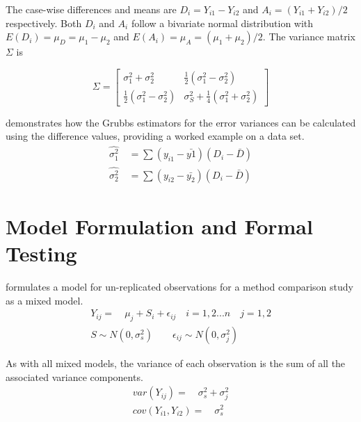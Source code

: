 \documentclass[12pt, a4paper]{report}
\theoremstyle{plain}
\theoremstyle{definition}
\theoremstyle{remark}
\begin{document}
	The case-wise differences and means are $D_{i} = Y_{i1}-Y_{i2}$
	and $A_{i} = (Y_{i1}+Y_{i2})/2$  respectively. Both $D_{i}$ and
	$A_{i}$ follow a bivariate normal distribution with $E(D_{i})=
	\mu_{D} = \mu_{1} - \mu_{2}$ and $E(A_{i})= \mu_{A} = (\mu_{1} +
	\mu_{2})/2$. The variance matrix $\Sigma$ is
	
	\begin{equation}
	\Sigma = \left[\begin{matrix}
	\sigma^{2}_{1}+\sigma^{2}_{2}&\frac{1}{2}(\sigma^{2}_{1}-\sigma^{2}_{2})\\
	\frac{1}{2}(\sigma^{2}_{1}-\sigma^{2}_{2})&\sigma^{2}_{S}+
	\frac{1}{4}(\sigma^{2}_{1}+\sigma^{2}_{2})
	\end{matrix} \right]
	\end{equation}
	
	
	
	
	
	\citet{Kinsella} demonstrates how the Grubbs estimators for the
	error variances can be calculated using the difference values,
	providing a worked example on a data set.
	\begin{eqnarray}
	\hat{\sigma^{2}_{1}}
	\quad=\sum{(y_{i1}-\bar{y{1}})(D_{i}-\bar{D})}\\
	\hat{\sigma^{2}_{2}} \quad=
	\sum{(y_{i2}-\bar{y_{2}})(D_{i}-\bar{D})} \nonumber
	\end{eqnarray}
	
	\section{Model Formulation and Formal Testing}
	
	\citet{Kinsella} formulates a model for un-replicated observations
	for a method comparison study as a mixed model.
	\begin{eqnarray}
	Y_{ij} =\quad \mu_{j} + S_{i} + \epsilon_{ij} \quad i=1,2...n\quad
	j=1,2\\
	S \sim N(0,\sigma^{2}_{s})\qquad \epsilon_{ij} \sim
	N(0,\sigma^{2}_{j}) \nonumber
	\end{eqnarray}
	
	As with all mixed models, the variance of each observation is the
	sum of all the associated variance components.
	\begin{eqnarray}
	var(Y_{ij}) =\quad \sigma^{2}_{s} + \sigma^{2}_{j} \\
	cov(Y_{i1},Y_{i2})=\quad \sigma^{2}_{s} \nonumber
	\end{eqnarray}
	
\end{document}
